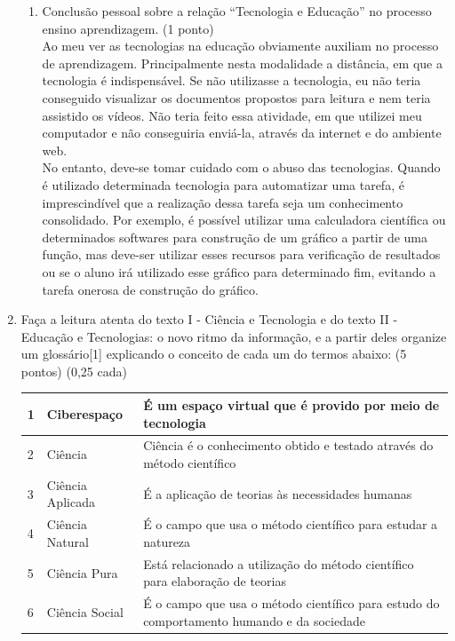 \documentclass[a4paper, 12pt]{article}
\begin{document}
\begin{enumerate}
\begin{enumerate}
  \item Conclusão pessoal sobre a relação “Tecnologia e Educação” no processo ensino aprendizagem. (1 ponto) \\
    Ao meu ver as tecnologias na educação obviamente auxiliam no processo de aprendizagem. Principalmente nesta modalidade a distância, em que a tecnologia é indispensável. Se não utilizasse a tecnologia, eu não teria conseguido visualizar os documentos propostos para leitura e nem teria assistido os vídeos. Não teria feito essa atividade, em que utilizei meu computador e não conseguiria enviá-la, através da internet e do ambiente web. \\
    No entanto, deve-se tomar cuidado com o abuso das tecnologias. Quando é utilizado determinada tecnologia para automatizar uma tarefa, é imprescindível que a realização dessa tarefa seja um conhecimento consolidado. Por exemplo, é possível utilizar uma calculadora científica ou determinados softwares para construção de um gráfico a partir de uma função, mas deve-ser utilizar esses recursos para verificação de resultados ou se o aluno irá utilizado esse gráfico para determinado fim, evitando a tarefa onerosa de construção do gráfico.
  \end{enumerate}
  \item Faça a leitura atenta do texto I  - Ciência e  Tecnologia e   do texto II -  Educação e Tecnologias: o novo ritmo da informação,   e a partir deles organize um glossário[1] explicando o conceito de cada um do termos abaixo: (5 pontos) (0,25 cada) \\
    \begin{tabular}{|m{0.5cm}|m{5cm}|m{8cm}|}
      \hline
      1 & Ciberespaço & É um espaço virtual que é provido por meio de tecnologia \\
      \hline
      2 & Ciência & Ciência é o conhecimento obtido e testado através do método científico \\
      \hline
      3 & Ciência Aplicada & É a aplicação de teorias às necessidades humanas\\
      \hline
      4 & Ciência Natural & É o campo que usa o método científico para estudar a natureza\\
      \hline
      5 & Ciência Pura & Está relacionado a utilização do método científico para elaboração de teorias\\
      \hline
      6 & Ciência Social & É o campo que usa o método científico para estudo do comportamento humando e da sociedade\\
      \hline

\end{tabular}
\end{enumerate}
\end{document}
